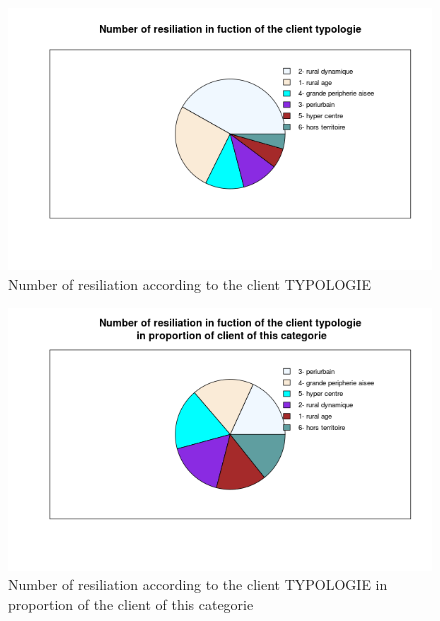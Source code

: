 \documentclass[a4paper, 11pt]{article}
\begin{document}
        

        \begin{figure}[!ht]
        	\centering
                \includegraphics[height = 10 cm]{Valentin/Number_of_resiliation_in_fuction_of_the_client_typologie.png}
                \caption{Number of resiliation according to the client TYPOLOGIE}
                \label{fig:resiliation_typo1}
        \end{figure}
        
        \begin{figure}[!ht]
        	\centering
                \includegraphics[height = 10 cm]{Valentin/Number_of_resiliation_in_fuction_of_the_client_typologie_proportion.png}
                \caption{Number of resiliation according to the client TYPOLOGIE in proportion of the client of this categorie}
                \label{fig:resiliation_typo2}
        \end{figure}
        
\end{document}
